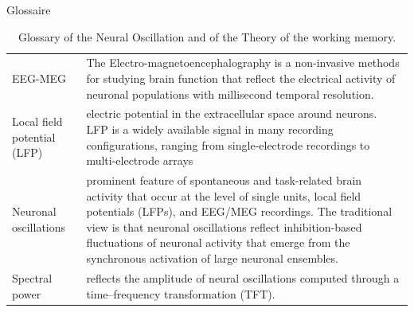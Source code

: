 Glossaire

\begin{table}[ht]
    \caption{Glossary of the Neural Oscillation and of the Theory of the working memory. \cite{roux2014working}}
    \centering
    \begin{tabular}{@{}| p{4cm}|p{9cm}| @{}}
        \hline
        EEG-MEG                     & The Electro-magnetoencephalography is a non-invasive methods for studying brain function that reflect the electrical activity of neuronal populations with millisecond temporal resolution.                                                                                                                                                             \\

        Local field potential (LFP) & electric potential in the extracellular space around neurons. LFP is a widely available signal in many recording configurations, ranging from single-electrode recordings to multi-electrode arrays                                                                                                                                                     \\
        Neuronal oscillations       & prominent feature of spontaneous and task-related brain activity that occur at the level of single units, local field potentials (LFPs), and EEG/MEG recordings. The traditional view is that neuronal oscillations reflect inhibition-based fluctuations of neuronal activity that emerge from the synchronous activation of large neuronal ensembles. \\
        Spectral power              & reflects the amplitude of neural oscillations computed through a time–frequency transformation (TFT).                                                                                                                                                                                                                                                   \\
        \hline
    \end{tabular}
    \label{Tab:Glossary_theory}
\end{table}

